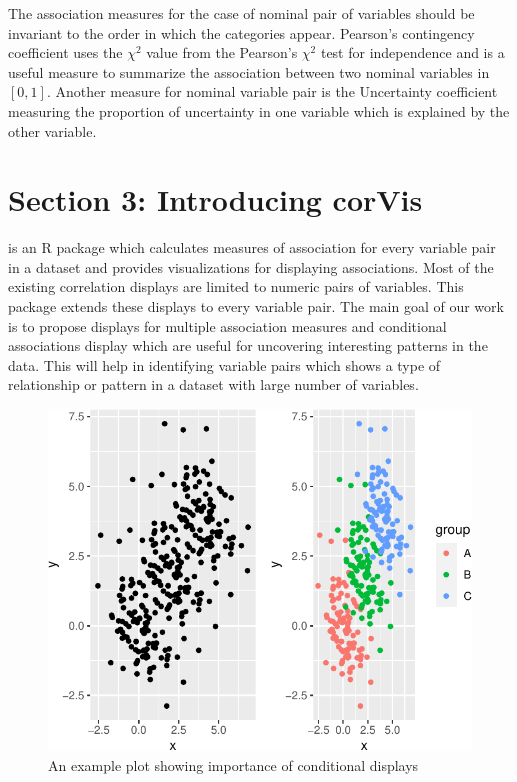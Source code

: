 The association measures for the case of nominal pair of variables
should be invariant to the order in which the categories appear.
Pearson's contingency coefficient uses the \({\chi}^2\) value from the
Pearson's \({\chi}^2\) test for independence and is a useful measure to
summarize the association between two nominal variables in \([0,1]\).
Another measure for nominal variable pair is the Uncertainty coefficient
\citep{theil1970estimation} measuring the proportion of uncertainty in
one variable which is explained by the other variable.

\hypertarget{section-3-introducing-corvis}{%
\section{Section 3: Introducing
corVis}\label{section-3-introducing-corvis}}

 is an R package which calculates measures of
association for every variable pair in a dataset and provides
visualizations for displaying associations. Most of the existing
correlation displays are limited to numeric pairs of variables. This
package extends these displays to every variable pair. The main goal of
our work is to propose displays for multiple association measures and
conditional associations display which are useful for uncovering
interesting patterns in the data. This will help in identifying variable
pairs which shows a type of relationship or pattern in a dataset with
large number of variables.

\begin{Schunk}
\begin{figure}

{\centering \includegraphics{rj_paper_files/figure-latex/motivation2-1} 

}

\caption[An example plot showing importance of conditional displays]{An example plot showing importance of conditional displays}\label{fig:motivation2}
\end{figure}
\end{Schunk}

